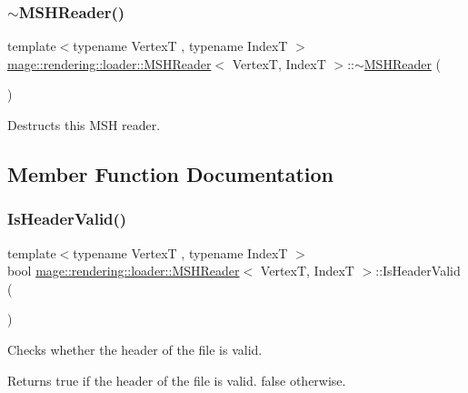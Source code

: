 \subsubsection{\texorpdfstring{$\sim$\+M\+S\+H\+Reader()}{~MSHReader()}}
{\footnotesize\ttfamily template$<$typename VertexT , typename IndexT $>$ \\
\hyperlink{classmage_1_1rendering_1_1loader_1_1_m_s_h_reader}{mage\+::rendering\+::loader\+::\+M\+S\+H\+Reader}$<$ VertexT, IndexT $>$\+::$\sim$\hyperlink{classmage_1_1rendering_1_1loader_1_1_m_s_h_reader}{M\+S\+H\+Reader} (\begin{DoxyParamCaption}{ }\end{DoxyParamCaption})}

Destructs this M\+SH reader. 

\subsection{Member Function Documentation}
\hypertarget{classmage_1_1rendering_1_1loader_1_1_m_s_h_reader_a7e6948dfb5f5c672719ebe10c4dae6bf}{}\label{classmage_1_1rendering_1_1loader_1_1_m_s_h_reader_a7e6948dfb5f5c672719ebe10c4dae6bf} 
\subsubsection{\texorpdfstring{Is\+Header\+Valid()}{IsHeaderValid()}}
{\footnotesize\ttfamily template$<$typename VertexT , typename IndexT $>$ \\
bool \hyperlink{classmage_1_1rendering_1_1loader_1_1_m_s_h_reader}{mage\+::rendering\+::loader\+::\+M\+S\+H\+Reader}$<$ VertexT, IndexT $>$\+::Is\+Header\+Valid (\begin{DoxyParamCaption}{ }\end{DoxyParamCaption})\hspace{0.3cm}{\ttfamily [private]}}

Checks whether the header of the file is valid.

\begin{DoxyReturn}{Returns}
{\ttfamily true} if the header of the file is valid. {\ttfamily false} otherwise. 
\end{DoxyReturn}
\hypertarget{classmage_1_1rendering_1_1loader_1_1_m_s_h_reader_a106e5a6cce46777cf7ae36cb4034e1a0}{}\label{classmage_1_1rendering_1_1loader_1_1_m_s_h_reader_a106e5a6cce46777cf7ae36cb4034e1a0} 

